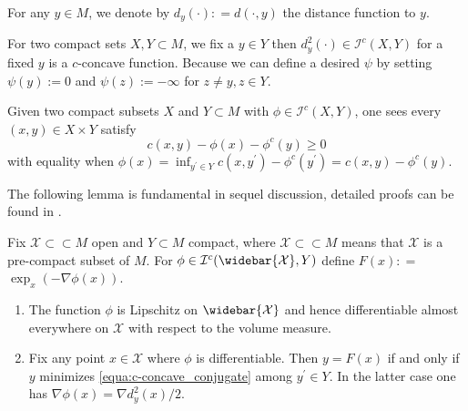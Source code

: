 For any \( y \in M \), we denote by \( d _ { y } ( \cdot ) : = d ( \cdot , y ) \)
the distance function to \( y \).
\begin{example}
	\label{example:square_distance_c-concave}
	For two compact sets $X,Y \subset M$, we fix a $y \in Y$ then
	$d^2_y(\cdot) \in \mathcal{I}^c (X,Y)$ for a fixed $y$ is a $c$-concave function.
	Because we can define a desired $\psi$ by setting $\psi (y) := 0$ and $\psi (z) := - \infty$ for $ z \neq y, z \in Y$.
\end{example}

Given two compact subsets \( X \) and \( Y \subset M \) with \( \phi \in \mathcal { I } ^ { c } ( X , Y ) \),
one sees every \( ( x , y ) \in X \times Y \) satisfy
\begin{equation}
	\label{equa:c-concave_conjugate}
	c ( x , y ) - \phi ( x ) - \phi ^ { c } ( y ) \geq 0
\end{equation}
with equality when \( \phi ( x ) = \inf _ { y ^ { \prime } \in Y } c \left( x , y ^ { \prime } \right) - \phi ^ { c } \left( y ^ { \prime } \right) = c ( x , y ) - \phi ^ { c } ( y ) . \)

The following lemma \cite[Lemma 3.2]{cordero2001riemannian} is fundamental in sequel discussion,
detailed proofs can be found in \cite[Lemmas 2 and 7]{mccann2001polar}.
\begin{lem}
	\label{lem:minimizer_differentiable}
	Fix \( \mathcal{X} \subset \subset M \) open and \( Y \subset M \) compact,
	where $ \mathcal{X} \subset \subset M $ means that $\mathcal{X}$ is a pre-compact subset of $M$.
	For \( \phi \in \mathcal{I} ^ { c } ( \widebar { \mathcal{X} } , Y ) \) define \( F ( x ) : = \)
	\( \exp _ { x } ( - \nabla \phi ( x ) ) \).
	\begin{enumerate}
		\item The function \( \phi \) is Lipschitz on \( \widebar { \mathcal{X} } \) and
		      hence differentiable almost everywhere on \( \mathcal{X} \) with respect to the volume measure.
		\item Fix any point \( x \in  \mathcal{X} \) where \( \phi \) is differentiable. Then \( y = F ( x ) \) if and
		      only if \( y \) minimizes \cref{equa:c-concave_conjugate} among \( y ^ { \prime } \in Y . \) In the latter case one has
		      \( \nabla \phi ( x ) = \nabla d _ { y } ^ { 2 } ( x ) / 2 \).
	\end{enumerate}
\end{lem}

